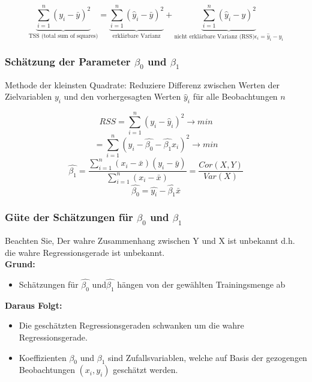 \documentclass[10pt]{report}
\theoremstyle{definition}
\begin{document}
\[ \underbrace{\sum\limits_{i=1}^n (y_i - \bar{y})^2}_{\text{TSS (total sum of squares)}} = \underbrace{\sum\limits_{i=1}^n (\hat{y}_i - \bar{y})^2}_{\text{erklärbare Varianz}} + \underbrace{\sum\limits_{i=1}^n (\hat{y}_i - y)^2}_{\text{nicht erklärbare Varianz (RSS)} \epsilon_i = \hat{y}_i -y_i} \]

\subsubsection{Schätzung der Parameter $\beta_0$ und $\beta_1$}
Methode der kleinsten Quadrate: Reduziere Differenz zwischen Werten der Zielvariablen $y_i$ und den vorhergesagten Werten $\hat{y}_i$ für alle Beobachtungen $n$

\[ RSS = \sum\limits_{i=1}^n (y_i -\hat{y}_i)^2 \rightarrow min \]
\[ = \sum\limits_{i=1}^n (y_i -\hat{\beta_0} - \hat{\beta_1} x_i)^2 \rightarrow min \]
\[ \hat{\beta_1} = \frac{\sum\limits_{i=1}^n(x_i - \bar{x})(y_i - \bar{y})}{\sum\limits_{i=1}^n(x_i - \bar{x})} = 
\frac{Cor(X,Y)}{Var(X)} \]
\[ \hat{\beta_0} = \hat{y_i} - \hat{\beta_1}\bar{x} \]
	
\subsubsection{Güte der Schätzungen für $\beta_0$ und $\beta_1$}
Beachten Sie, Der wahre Zusammenhang zwischen Y und X ist unbekannt d.h. die wahre Regressionsgerade ist unbekannt. \\
\textbf{Grund:} 
\begin{itemize}
	\item Schätzungen für $\hat{\beta_0}$ und$ \hat{\beta_1}$ hängen von der gewählten Trainingsmenge ab\\
\end{itemize}
\textbf{Daraus Folgt:} 
\begin{itemize}
	\item Die geschätzten Regressionsgeraden schwanken um die wahre Regressionsgerade.
	\item Koeffizienten $\beta_0$ und $\beta_1$ sind Zufallsvariablen, welche auf Basis der gezogengen Beobachtungen $(x_i,y_i)$ geschätzt werden.
\end{itemize}


\end{document}
